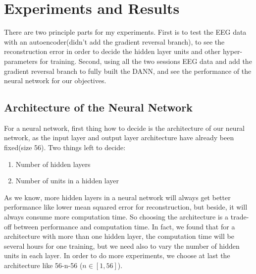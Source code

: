 
\chapter{Experiments and Results} %

\label{Chapter5} %



There are two principle parts for my experiments. First is to test the EEG data with an autoencoder(didn't add the gradient reversal branch), to see the reconstruction error in order to decide the hidden layer units and other hyper-parameters for training. Second, using all the two sessions EEG data and add the gradient reversal branch to fully built the DANN, and see the performance of the neural network for our objectives.
\section{Architecture of the Neural Network}
For a neural network, first thing how to decide is the architecture of our neural network, as the input layer and output layer architecture have already been fixed(size 56). Two things left to decide:
\begin{enumerate}
	\item Number of hidden layers
	\item Number of units in a hidden layer
\end{enumerate}

As we know, more hidden layers in a neural network will always get better performance like lower mean squared error for reconstruction, but beside, it will always consume more computation time. So choosing the architecture is a trade-off between performance and computation time. In fact, we found that for a architecture with more than one hidden layer, the computation time will be several hours for one training, but we need also to vary the number of hidden units in each layer. In order to do more experiments, we choose at last the architecture like 56-n-56 ($ n \in [1,56] $).

